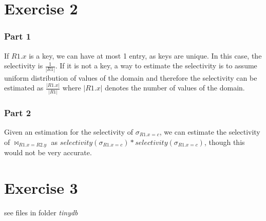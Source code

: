 \documentclass[11pt,a4paper]{scrartcl}
\begin{document}
\section*{Exercise 2}

\subsubsection*{Part 1}

If $R1.x$ is a key, we can have at most 1 entry, as keys are unique. In this case, the selectivity is $\frac{1}{|R1|}$. If it is not a key, a way to estimate the selectivity is to assume uniform distribution of values of the domain and therefore the selectivity can be estimated as $\frac{|R1.x|}{|R1|}$ where $|R1.x|$ denotes the number of values of the domain.

\subsubsection*{Part 2}

Given an estimation for the selectivity of $\sigma_{R1.x=c}$, we can estimate the selectivity of $\Join_{R1.x=R2.y}$ as $selectivity(\sigma_{R1.x=c})*selectivity(\sigma_{R1.x=c})$, though this would not be very accurate.

\section*{Exercise 3}

see files in folder \textit{tinydb}
\end{document}
